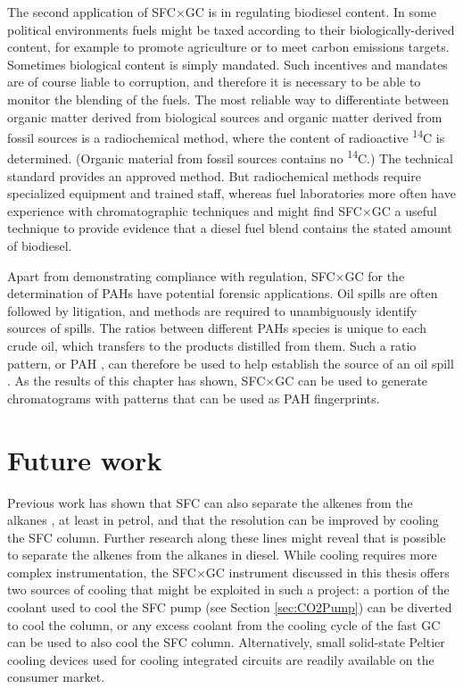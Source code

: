 The second application of SFC×GC is in regulating biodiesel content. In some
political environments fuels might be taxed according to their
biologically-derived content, for example to promote agriculture or to meet
carbon emissions targets. Sometimes biological content is simply mandated. Such
incentives and mandates are of course liable to corruption, and therefore it is
necessary to be able to monitor the blending of the fuels. The most
reliable way to differentiate between organic matter derived from biological
sources and organic matter derived from fossil sources is a radiochemical
method, where the content of radioactive \textsuperscript{14}C is determined.
(Organic material from fossil sources contains no \textsuperscript{14}C.) The
technical standard  provides an approved method. But radiochemical
methods require specialized equipment and trained staff, whereas fuel
laboratories more often have experience with chromatographic techniques and
might find SFC×GC a useful technique to provide evidence that a diesel fuel
blend contains the stated amount of biodiesel.

Apart from demonstrating compliance with regulation, SFC×GC for the
determination of PAHs have potential forensic applications. Oil spills are often
followed by litigation, and methods are required to unambiguously identify
sources of spills. The ratios between different PAHs species is unique to each
crude oil, which transfers to the products distilled from them. Such a ratio
pattern, or PAH , can therefore be used to help establish
the source of an oil spill \autocite{Wang2008}. As the results of this chapter
has shown, SFC×GC can be used to generate chromatograms with patterns that can
be used as PAH fingerprints.

\section{Future work}

Previous work has shown that SFC can also separate the alkenes from the alkanes
\autocite{Venter1999}, at least in petrol, and that the resolution can be
improved by cooling the SFC column. Further research along these lines might
reveal that is possible to separate the alkenes from the alkanes in diesel.
While cooling requires more complex instrumentation, the SFC×GC instrument
discussed in this thesis offers two sources of cooling that might be exploited
in such a project: a portion of the coolant used to cool the SFC pump (see
Section \ref{sec:CO2Pump}) can be diverted to cool the column, or any excess
coolant from the cooling cycle of the fast GC can be used to also cool the SFC
column. Alternatively, small solid-state Peltier cooling devices used for
cooling integrated circuits are readily available on the consumer market.

